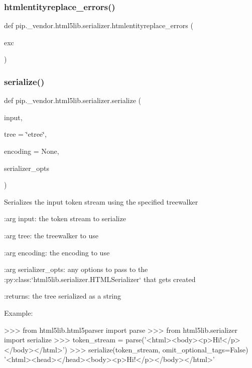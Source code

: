 \subsubsection{\texorpdfstring{htmlentityreplace\+\_\+errors()}{htmlentityreplace\_errors()}}
{\footnotesize\ttfamily def pip.\+\_\+vendor.\+html5lib.\+serializer.\+htmlentityreplace\+\_\+errors (\begin{DoxyParamCaption}\item[{}]{exc }\end{DoxyParamCaption})}

\mbox{\label{namespacepip_1_1__vendor_1_1html5lib_1_1serializer_a8db95115d1fd7c943fe4b138e810ed5b}} 
\subsubsection{\texorpdfstring{serialize()}{serialize()}}
{\footnotesize\ttfamily def pip.\+\_\+vendor.\+html5lib.\+serializer.\+serialize (\begin{DoxyParamCaption}\item[{}]{input,  }\item[{}]{tree = {\ttfamily \char`\"{}etree\char`\"{}},  }\item[{}]{encoding = {\ttfamily None},  }\item[{}]{serializer\+\_\+opts }\end{DoxyParamCaption})}

\begin{DoxyVerb}Serializes the input token stream using the specified treewalker

:arg input: the token stream to serialize

:arg tree: the treewalker to use

:arg encoding: the encoding to use

:arg serializer_opts: any options to pass to the
    :py:class:`html5lib.serializer.HTMLSerializer` that gets created

:returns: the tree serialized as a string

Example:

>>> from html5lib.html5parser import parse
>>> from html5lib.serializer import serialize
>>> token_stream = parse('<html><body><p>Hi!</p></body></html>')
>>> serialize(token_stream, omit_optional_tags=False)
'<html><head></head><body><p>Hi!</p></body></html>'\end{DoxyVerb}
 

